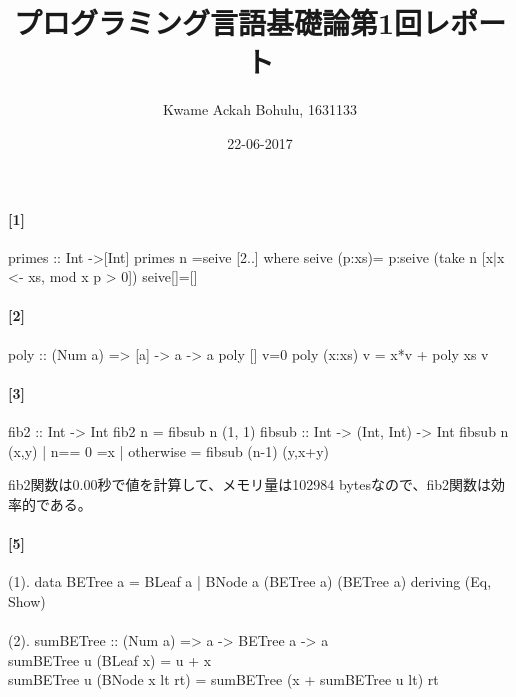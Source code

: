 \documentclass[20 pts]{article}
\title{プログラミング言語基礎論第1回レポート}
\author{Kwame Ackah Bohulu, 1631133}
\date{22-06-2017}
\begin{document}
\maketitle

\newpage
\paragraph{[1]}

primes :: Int ->[Int]\newline
primes n =seive [2..]\newline
       where \newline
       seive (p:xs)= p:seive (take n [x|x <- xs, mod x p > 0])\newline
       seive[]=[]\newline
       
    \paragraph{[2]}
       poly :: (Num a) => [a] -> a -> a\newline
poly [] v=0\newline
poly (x:xs) v = x*v + poly xs v\newline
       
        \paragraph{[3]}
       
       fib2 :: Int -> Int\newline
fib2 n = fibsub n (1, 1)\newline
fibsub :: Int -> (Int, Int) -> Int\newline
fibsub n (x,y) | n== 0 =x\newline
               | otherwise = fibsub (n-1) (y,x+y)\newline
               
               fib2関数は0.00秒で値を計算して、メモリ量は102984 bytesなので、fib2関数は効率的である。
               
               \paragraph{[5]}
               (1). data BETree a = BLeaf a | BNode a (BETree a) (BETree a)\newline
               deriving (Eq, Show)\paragraph{}
               (2). sumBETree :: (Num a) => a -> BETree a -> a\\
sumBETree u (BLeaf x) = u + x\\
sumBETree u (BNode x lt rt) =  sumBETree (x + sumBETree u lt) rt\\
\end{document}
